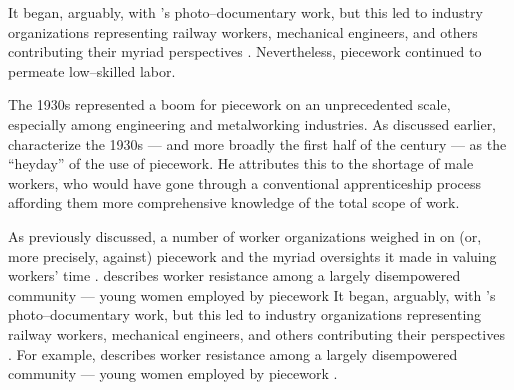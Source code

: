 \documentclass[trackingWork]{subfiles}
\begin{document}
It began, arguably, with \citeauthor{riisOtherSideLives}'s photo--documentary work,
but this led to industry organizations representing
railway workers, mechanical engineers, and others contributing their myriad perspectives
\cite{american1921problem,richards1904anything,riisOtherSideLives}.
Nevertheless, piecework continued to permeate low--skilled labor.


The 1930s represented a boom for piecework on an unprecedented scale,
especially among engineering and metalworking industries.
As discussed earlier, \citeauthor{hart2013rise} characterize the 1930s
--- and more broadly the first half of the  century ---
as the ``heyday'' of the use of piecework.
He attributes this to the shortage of male workers,
who would have gone through a conventional apprenticeship process
affording them more comprehensive knowledge of the total scope of work.

As previously discussed, a number of worker organizations weighed in on
(or, more precisely, against) piecework and the myriad oversights it made in valuing workers' time
\cite{american1921problem,richards1904anything}.
\citeauthor{10.2307/3827491} describes worker resistance among a largely disempowered community --- young women employed by piecework
It began, arguably, with \citeauthor{riisOtherSideLives}'s photo--documentary work,
but this led to industry organizations representing
railway workers, mechanical engineers, and others contributing their perspectives
\cite{american1921problem,richards1904anything,riisOtherSideLives}.
For example, \citeauthor{10.2307/3827491} describes worker resistance among a largely disempowered community --- young women employed by piecework
\cite{10.2307/3827491}.
\end{document}
